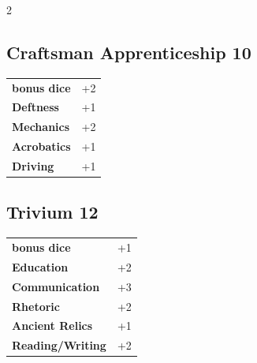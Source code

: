 \begin{multicols}{2}
\begin{tcolorbox}

\end{tcolorbox}

\begin{tcolorbox}
    \subsection*{Craftsman Apprenticeship \hfill \small{10 }}
    \tcblower




\begin{tabular}{@{}ll@{}}
    \textbf{bonus dice} & +2\\
    \textbf{Deftness} & +1\\
    \textbf{Mechanics} & +2\\
    \textbf{Acrobatics} & +1\\
    \textbf{Driving} & +1\\
\end{tabular}


\end{tcolorbox}

\begin{tcolorbox}
    \subsection*{Trivium \hfill \small{12 }}
    \tcblower




\begin{tabular}{@{}ll@{}}
    \textbf{bonus dice} & +1\\
    \textbf{Education} & +2\\
    \textbf{Communication} & +3\\
    \textbf{Rhetoric} & +2\\
    \textbf{Ancient Relics} & +1\\
    \textbf{Reading/Writing} & +2\\
\end{tabular}


\end{tcolorbox}
\end{multicols}
